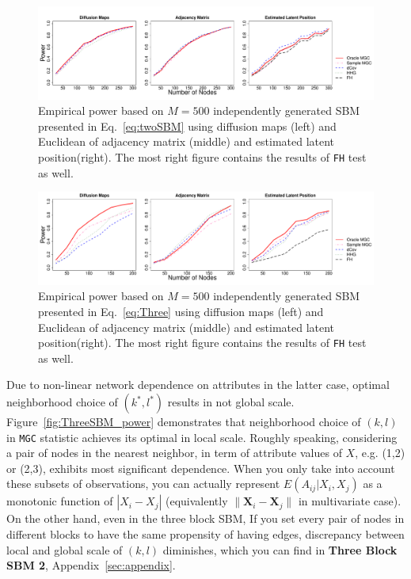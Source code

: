 \documentclass[12pt]{article}
\theoremstyle{definition}
\begin{document}
\begin{figure}[h]
	\centering
	\includegraphics[width=7in]{../Figure/twoSBM.pdf}
	\caption{Empirical power based on $M = 500$ independently generated SBM presented in Eq.~\ref{eq:twoSBM} using diffusion maps (left) and Euclidean of adjacency matrix (middle)  and estimated latent position(right). The most right figure contains the results of \texttt{FH} test as well.}
		\label{fig:twoSBM}
\end{figure}
\begin{figure}[h]
	\centering
	\includegraphics[width=7in]{../Figure/ThreeSBM.pdf}
	\caption{Empirical power based on $M = 500$ independently generated SBM presented in Eq.~\ref{eq:Three} using diffusion maps (left) and Euclidean of adjacency matrix (middle)  and estimated latent position(right). The most right figure contains the results of \texttt{FH} test as well.}
	\label{fig:Three}
\end{figure}	

Due to non-linear network dependence on attributes in the latter case, optimal neighborhood choice of $(k^{*}, l^{*})$ results in not global scale.  Figure~\ref{fig:ThreeSBM_power} demonstrates that neighborhood choice of $(k,l)$ in \texttt{MGC} statistic achieves its optimal in local scale. Roughly speaking, considering a pair of nodes in the nearest neighbor, in term of attribute values of $X$, e.g. (1,2) or (2,3), exhibits most significant dependence. When you only take into account these subsets of observations, you can actually represent $E(A_{ij} | X_{i}, X_{j})$ as a monotonic function of $|X_{i} - X_{j}|$ (equivalently $\parallel \mathbf{X}_{i} - \mathbf{X}_{j} \parallel$ in multivariate case). On the other hand, even in the three block SBM, If you set every pair of nodes in different blocks to have the same propensity of having edges, discrepancy between local and global scale of $(k,l)$ diminishes, which you can find in \textbf{Three Block SBM 2}, Appendix~\ref{sec:appendix}.
\end{document}
